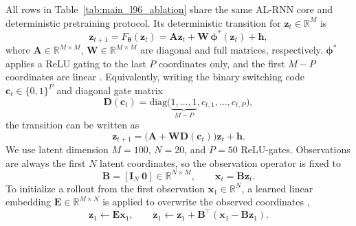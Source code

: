 \documentclass{article}
\theoremstyle{plain}
\theoremstyle{definition}
\theoremstyle{remark}
\begin{document}
All rows in Table~\ref{tab:main_l96_ablation} share the same AL-RNN core and deterministic pretraining protocol. Its deterministic transition for $\bm z_t\in\mathbb R^M$ is
\begin{equation}
\label{eq:alrnn}
\bm z_{t+1}
=
F_{\bm\theta}(\bm z_t)
=
\bm A\bm z_t + \bm W\,\bm\phi^\ast(\bm z_t) + \bm h,
\end{equation}
where $\bm A \in \mathbb{R}^{M\times M}$, $\bm W \in \mathbb{R}^{M\times M}$ are diagonal and full matrices, respectively. $\bm\phi^\ast$ applies a ReLU gating to the last $P$ coordinates only, and the first $M-P$ coordinates are linear \citep{brenner2024almostlinear}. Equivalently, writing the binary switching code $\bm c_t\in\{0,1\}^P$ and diagonal gate matrix
\[
\bm D(\bm c_t)
=
\mathrm{diag}\big(\underbrace{1,\dots,1}_{M-P},c_{t,1},\dots,c_{t,P}\big),
\]
the transition can be written as
\begin{equation}
\label{app:alrnn-transition}
\bm z_{t+1}=
\big(\bm A+\bm W\bm D(\bm c_t)\big)\bm z_t + \bm h.
\end{equation}
We use latent dimension $M=100$, $N=20$, and $P=50$ ReLU-gates. Observations are always the first $N$ latent coordinates, so the observation operator is fixed to
\begin{equation}
\label{app:observation_operator}
\bm B = [\bm I_N\ \bm 0] \in \mathbb R^{N\times M},
\qquad
\bm x_t = \bm B\bm z_t.
\end{equation}
To initialize a rollout from the first observation $\bm x_1\in\mathbb R^N$, a learned linear embedding $\bm E\in\mathbb R^{M\times N}$ is applied to overwrite the observed coordinates \citep{brenner2024almostlinear},
\[
\bm z_1 \leftarrow \bm E\bm x_1,
\qquad
\bm z_1 \leftarrow \bm z_1 + \bm B^{\top}(\bm x_1-\bm B\bm z_1).
\]
\end{document}
